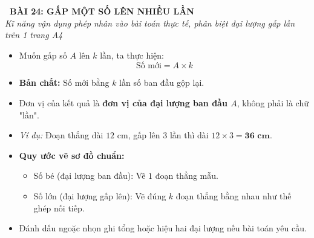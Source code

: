 \documentclass[12pt,a4paper]{article}
\begin{document}
\begin{tcolorbox}[
  enhanced,
  colback=teal!8!white,
  colframe=teal!70!black,
  arc=3mm, boxrule=1.2pt,
  left=3mm, right=3mm, top=2mm, bottom=2mm,
  halign=center
]
  {\LARGE\bfseries\color{teal!90!black}\faBookmark\ BÀI 24: GẤP MỘT SỐ LÊN NHIỀU LẦN}\\[1mm]
  {\itshape\footnotesize\color{black!75} Kĩ năng vận dụng phép nhân vào bài toán thực tế, phân biệt đại lượng gấp lần trên 1 trang A4}
\end{tcolorbox}

\vspace{-2mm}

\noindent
\begin{minipage}[t]{0.49\textwidth}\vspace{0pt}
\begin{tcolorbox}[
  enhanced,
  colback=blue!4!white,
  colframe=blue!75!black,
  arc=2mm, boxrule=0.8pt,
  left=2mm, right=2mm, top=1.8mm, bottom=1.8mm,
  title={\footnotesize\bfseries\color{white}\faMagic\ 1. Quy tắc cốt lõi}
]
{\footnotesize
\begin{itemize}\setlength{\itemsep}{1pt}\setlength{\leftskip}{-2.5mm}
  \item Muốn gấp số $A$ lên $k$ lần, ta thực hiện:
  $$\text{Số mới} = A \times k$$
  \item \textbf{Bản chất:} Số mới bằng $k$ lần số ban đầu gộp lại.
  \item Đơn vị của kết quả là \textbf{đơn vị của đại lượng ban đầu $A$}, không phải là chữ "lần".
  \item \textit{Ví dụ:} Đoạn thẳng dài $12\text{ cm}$, gấp lên $3$ lần thì dài $12 \times 3 = \mathbf{36\text{ cm}}$.
\end{itemize}
}
\end{tcolorbox}
\end{minipage}
\hfill
\begin{minipage}[t]{0.49\textwidth}\vspace{0pt}
\begin{tcolorbox}[
  enhanced,
  colback=teal!4!white,
  colframe=teal!75!black,
  arc=2mm, boxrule=0.8pt,
  left=2mm, right=2mm, top=1.8mm, bottom=1.8mm,
  title={\footnotesize\bfseries\color{white}\faSliders\ 2. Kĩ thuật vẽ sơ đồ đoạn thẳng}
]
{\footnotesize
\begin{itemize}\setlength{\itemsep}{1pt}\setlength{\leftskip}{-2.5mm}
  \item \textbf{Quy ước vẽ sơ đồ chuẩn:}
  \begin{itemize}\setlength{\itemsep}{0.5pt}\setlength{\leftskip}{-2.5mm}
    \item Số bé (đại lượng ban đầu): Vẽ $1$ đoạn thẳng mẫu.
    \item Số lớn (đại lượng gấp lên): Vẽ đúng $k$ đoạn thẳng bằng nhau như thế ghép nối tiếp.
  \end{itemize}
  \item Đánh dấu ngoặc nhọn ghi tổng hoặc hiệu hai đại lượng nếu bài toán yêu cầu.
\end{itemize}
}
\end{tcolorbox}
\end{minipage}
\end{document}
